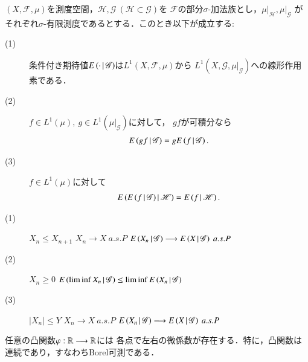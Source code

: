 	\begin{screen}
		\begin{thm}
			$(X,\mathscr{F},\mu)$を測度空間，$\mathscr{H},\mathscr{G}\ (\mathscr{H} \subset \mathscr{G})$を
			$\mathscr{F}$の部分$\sigma$-加法族とし，$\left. \mu \right|_{\mathscr{H}},\left. \mu \right|_{\mathscr{G}}$
			がそれぞれ$\sigma$-有限測度であるとする．このとき以下が成立する:
			\begin{description}
				\item[(1)] 条件付き期待値$E\left( \cdot \, \middle|\, \mathscr{G} \right)$は$L^1(X,\mathscr{F},\mu)$から
					$L^1\left(X,\mathscr{G},\left. \mu \right|_{\mathscr{G}}\right)$への線形作用素である．
				
				\item[(2)] $f \in L^1(\mu),\ g \in L^1(\left. \mu \right|_{\mathscr{G}})$に対して，
					$gf$が可積分なら
					\begin{align}
						E\left( gf \, \middle|\, \mathscr{G} \right) = gE\left( f \, \middle|\, \mathscr{G} \right).
					\end{align}
					
				\item[(3)] $f \in L^1(\mu)$に対して
					\begin{align}
						E\left( E\left( f \, \middle|\, \mathscr{G} \right) \, \middle|\, \mathscr{H} \right) = E\left( f \, \middle|\, \mathscr{H} \right).
					\end{align}
			\end{description}
		\end{thm}
	\end{screen}
	
	\begin{screen}
		\begin{thm}
			\begin{description}
				\item[(1)]
					$X_n \leq X_{n+1}$
					$X_n \longrightarrow X\ a.s.P$
					$E\left( X_n \, \middle|\, \mathscr{G} \right) \longrightarrow E\left( X \, \middle|\, \mathscr{G} \right)\ a.s.P$
				\item[(2)]
					$X_n \geq 0$
					$E\left( \liminf X_n \, \middle|\, \mathscr{G} \right) \leq \liminf E\left( X_n \, \middle|\, \mathscr{G} \right)$
				\item[(3)]
					$|X_n| \leq Y$ $X_n \longrightarrow X\ a.s.P$
					$E\left( X_n \, \middle|\, \mathscr{G} \right) \longrightarrow E\left( X \, \middle|\, \mathscr{G} \right)\ a.s.P$
			\end{description}
		\end{thm}
	\end{screen}
	
	\begin{screen}
	\begin{lem}[凸関数の片側微係数の存在]
		任意の凸関数$\varphi:\mathbb{R} \longrightarrow \mathbb{R}$には
		各点で左右の微係数が存在する．特に，凸関数は連続であり，すなわちBorel可測である．
	\end{lem}
	\end{screen}
	
